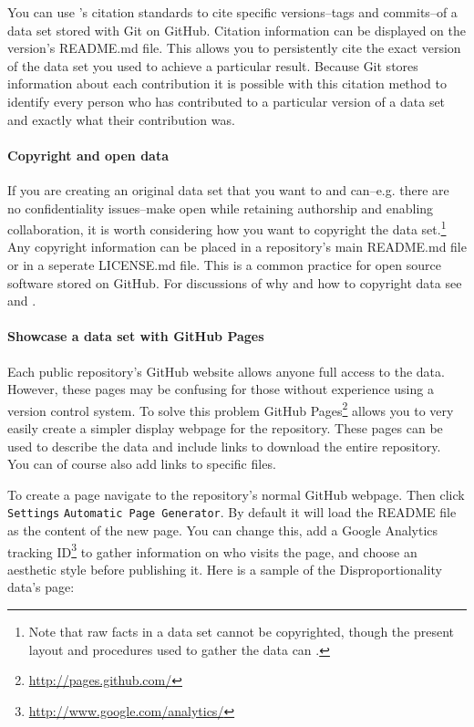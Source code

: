 \documentclass[twocolumn]{article}\usepackage{graphicx, color}
\begin{document}
You can use \citeauthor{Altman2007}'s citation standards to cite specific versions--tags and commits--of a data set stored with Git on GitHub. Citation information can be displayed on the version's README.md file. This allows you to persistently cite the exact version of the data set you used to achieve a particular result. Because Git stores information about each contribution it is possible with this citation method to identify every person who has contributed to a particular version of a data set and exactly what their contribution was.

\paragraph{Copyright and open data}

If you are creating an original data set that you want to and can--e.g. there are no confidentiality issues--make open while retaining authorship and enabling collaboration, it is worth considering how you want to copyright the data set.\footnote{Note that raw facts in a data set cannot be copyrighted, though the present layout and procedures used to gather the data can \citep[39]{Stodden2009}.} Any copyright information can be placed in a repository's main README.md file or in a seperate LICENSE.md file. This is a common practice for open source software stored on GitHub. For discussions of why and how to copyright data see \cite{Stodden2009} and \cite{CreativeCommons}.

\paragraph{Showcase a data set with GitHub Pages}

Each public repository's GitHub website allows anyone full access to the data. However, these pages may be confusing for those without experience using a version control system. To solve this problem GitHub Pages\footnote{\url{http://pages.github.com/}} allows you to very easily create a simpler display webpage for the repository. These pages can be used to describe the data and include links to download the entire repository. You can of course also add links to specific files.

To create a page navigate to the repository's normal GitHub webpage. Then click \texttt{Settings} \textrightarrow{} \texttt{Automatic Page Generator}. By default it will load the README file as the content of the new page. You can change this, add a Google Analytics tracking ID\footnote{\url{http://www.google.com/analytics/}} to gather information on who visits the page, and choose an aesthetic style before publishing it. Here is a sample of the Disproportionality data's page:
\end{document}
